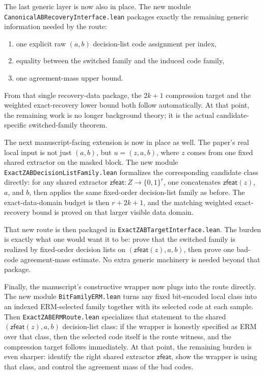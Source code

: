 \documentclass[11pt]{article}
\theoremstyle{remark}
\begin{document}
The last generic layer is now also in place.  The new module
\texttt{CanonicalABRecoveryInterface.lean} packages exactly the remaining
generic information needed by the route:
\begin{enumerate}[leftmargin=1.5em]
  \item one explicit raw \((a,b)\) decision-list code assignment per index,
  \item equality between the switched family and the induced code family,
  \item one agreement-mass upper bound.
\end{enumerate}
From that single recovery-data package, the \(2k+1\) compression target and the
weighted exact-recovery lower bound both follow automatically.  At that point,
the remaining work is no longer background theory; it is the actual
candidate-specific switched-family theorem.

The next manuscript-facing extension is now in place as well.  The paper's real
local input is not just \((a,b)\), but \(u=(z,a,b)\), where \(z\) comes from one
fixed shared extractor on the masked block.  The new module
\texttt{ExactZABDecisionListFamily.lean} formalizes the corresponding candidate
class directly: for any shared extractor \(\mathsf{zfeat}: Z \to \{0,1\}^r\), one
concatenates \(\mathsf{zfeat}(z)\), \(a\), and \(b\), then applies the same
fixed-order decision-list family as before.  The exact-data-domain budget is then
\(r+2k+1\), and the matching weighted exact-recovery bound is proved on that
larger visible data domain.

That new route is then packaged in \texttt{ExactZABTargetInterface.lean}.  The
burden is exactly what one would want it to be: prove that the switched family
is realized by fixed-order decision lists on \((\mathsf{zfeat}(z),a,b)\), then
prove one bad-code agreement-mass estimate.  No extra generic machinery is
needed beyond that package.

Finally, the manuscript's constructive wrapper now plugs into the route
directly.  The new module \texttt{BitFamilyERM.lean} turns any fixed bit-encoded
local class into an indexed ERM-selected family together with its selected code
at each sample.  Then \texttt{ExactZABERMRoute.lean} specializes that statement
to the shared \((\mathsf{zfeat}(z),a,b)\) decision-list class: if the wrapper is
honestly specified as ERM over that class, then the selected code itself is the
route witness, and the compression target follows immediately.  At that point,
the remaining burden is even sharper: identify the right shared extractor
\(\mathsf{zfeat}\), show the wrapper is using that class, and control the
agreement mass of the bad codes.
\end{document}
